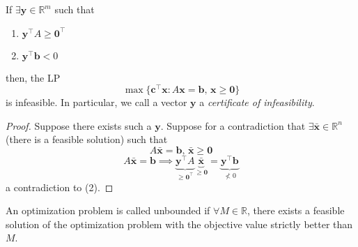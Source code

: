 \begin{thmbox}
    \begin{theorem}[Infeasibility]
        If
        $\exists \bm{y}\in\mathbb{R}^m$ such that
        \begin{enumerate}[label=(\arabic*)]
            \item $\bm{y}^\top A\geqslant \bm{0}^\top $
            \item $\bm{y}^\top \bm{b}<0$
        \end{enumerate}
        then, the LP
        \[\max \{\bm{c}^\top \bm{x} : A\bm{x}=\bm{b},\,
            \bm{x}\geqslant \bm{0}\}\]
        is infeasible. In particular, we call a vector $\bm{y}$ a \emph{certificate of infeasibility}.
    \end{theorem}
\end{thmbox}

\begin{proof}
    Suppose there exists such a $ \bm{y} $.
    Suppose for a contradiction that $\exists\bm{\bar{x}}\in\mathbb{R}^n$
    (there is a feasible solution)
    such that
    \[A\bm{\bar{x}}=\bm{b} \text{, }\bm{\bar{x}}\geqslant  \bm{0}\]
    \[
        A\bm{\bar{x}}=\bm{b}
        \implies
        \underbrace{\bm{y}^\top A}_{\geqslant \bm{0}^\top }
        \underbrace{\bm{\bar{x}}}_{\geqslant \bm{0}}
        =\underbrace{\bm{y}^\top \bm{b}}_{\nless 0}
    \]
    a contradiction to (2).
\end{proof}

An optimization problem is called unbounded if $\forall M\in\mathbb{R}$, there
exists a feasible solution of the optimization problem with the objective
value strictly better than $M$.


